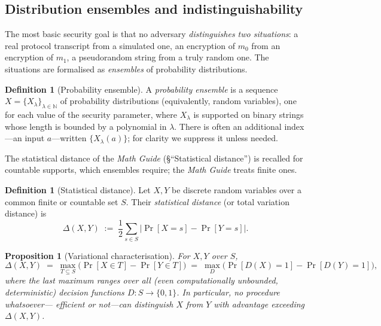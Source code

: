 \documentclass[11pt,a4paper]{article}
\newtheorem{proposition}[theorem]{Proposition}
\theoremstyle{definition}
\newtheorem{definition}[theorem]{Definition}
\theoremstyle{remark}
\newcommand{\N}{\ensuremath{\mathbb{N}}}
\begin{document}
\subsection{Distribution ensembles and indistinguishability}
\label{model:subsec:indist}

The most basic security goal is that no adversary \emph{distinguishes
two situations}: a real protocol transcript from a simulated one, an
encryption of \(m_0\) from an encryption of \(m_1\), a pseudorandom
string from a truly random one. The situations are formalised as
\emph{ensembles} of probability distributions.

\begin{definition}[Probability ensemble]\label{model:def:ensemble}
A \emph{probability ensemble} is a sequence
\(X = \{X_\lambda\}_{\lambda\in\N}\) of probability distributions
(equivalently, random variables), one for each value of the security
parameter, where \(X_\lambda\) is supported on binary strings whose
length is bounded by a polynomial in \(\lambda\). There is often an
additional index---an input \(a\)---written \(\{X_\lambda(a)\}\); for
clarity we suppress it unless needed.
\end{definition}

The statistical distance of the \emph{Math Guide} (\S``Statistical
distance'') is recalled for countable supports, which ensembles
require; the \emph{Math Guide} treats finite ones.

\begin{definition}[Statistical distance]\label{model:def:statdist}
Let \(X, Y\) be discrete random variables over a common finite or
countable set \(S\). Their \emph{statistical distance} (or total
variation distance) is
\[
  \Delta(X, Y) \;:=\; \frac{1}{2} \sum_{s \in S}
    \bigl| \Pr[X = s] - \Pr[Y = s] \bigr| .
\]
\end{definition}

\begin{proposition}[Variational characterisation]\label{model:prop:statdist}
For \(X, Y\) over \(S\),
\[
  \Delta(X, Y) \;=\; \max_{T \subseteq S}
    \bigl( \Pr[X \in T] - \Pr[Y \in T] \bigr)
  \;=\; \max_{D} \bigl( \Pr[D(X) = 1] - \Pr[D(Y) = 1] \bigr),
\]
where the last maximum ranges over all (even computationally
unbounded, deterministic) decision functions
\(D : S \to \{0,1\}\). In particular, no procedure whatsoever---
efficient or not---can distinguish \(X\) from \(Y\) with advantage
exceeding \(\Delta(X,Y)\).
\end{proposition}
\end{document}
